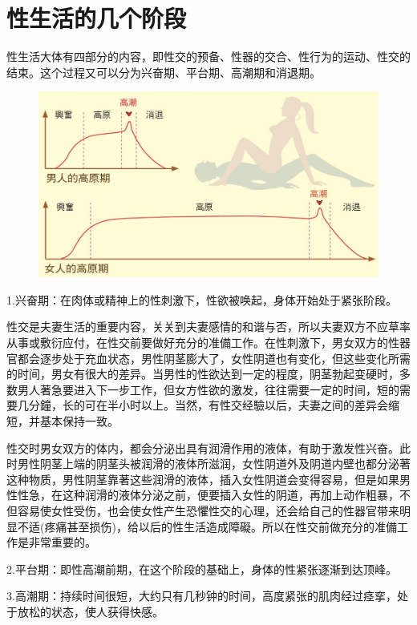\documentclass[12pt,UTF8]{ctexbook}
\begin{document}
\chapter{性生活的几个阶段}

性生活大体有四部分的内容，即性交的预备、性器的交合、性行为的运动、性交的结束。这个过程又可以分为兴奋期、平台期、高潮期和消退期。

\begin{figure}[htbp]
	\centering
	\includegraphics[width=1\linewidth]{6}
	\caption{}
	\label{fig:1}
\end{figure}

1.兴奋期：在肉体或精神上的性刺激下，性欲被唤起，身体开始处于紧张阶段。

性交是夫妻生活的重要内容，关关到夫妻感情的和谐与否，所以夫妻双方不应草率从事或敷衍应付，在性交前要做好充分的准備工作。在性刺激下，男女双方的性器官都会逐步处于充血状态，男性阴茎膨大了，女性阴道也有变化，但这些变化所需的时间，男女有很大的差异。当男性的性欲达到一定的程度，阴茎勃起变硬时，多数男人著急要进入下一步工作，但女方性欲的激发，往往需要一定的时间，短的需要几分鐘，长的可在半小时以上。当然，有性交经驗以后，夫妻之间的差异会缩短，并基本保持一致。

性交时男女双方的体内，都会分泌出具有润滑作用的液体，有助于激发性兴奋。此时男性阴茎上端的阴茎头被润滑的液体所滋润，女性阴道外及阴道内壁也都分泌著这种物质，男性阴茎靠著这些润滑的液体，插入女性阴道会变得容易，但是如果男性性急，在这种润滑的液体分泌之前，便要插入女性的阴道，再加上动作粗暴，不但容易使女性受伤，也会使女性产生恐懼性交的心理，还会给自己的性器官带来明显不适(疼痛甚至损伤)，给以后的性生活造成障礙。所以在性交前做充分的准備工作是非常重要的。

2.平台期：即性高潮前期，在这个阶段的基础上，身体的性紧张逐渐到达顶峰。

3.高潮期：持续时间很短，大约只有几秒钟的时间，高度紧张的肌肉经过痉挛，处于放松的状态，使人获得快感。
\end{document}
